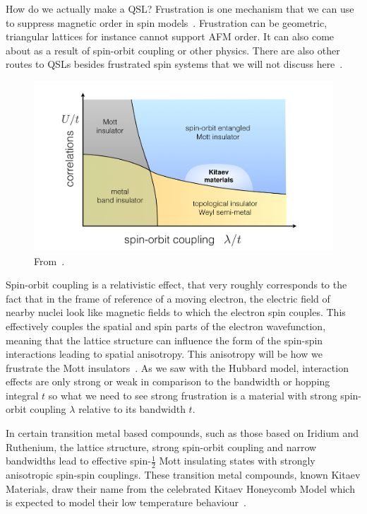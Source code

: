 How do we actually make a QSL? Frustration is one mechanism that we can use to suppress magnetic order in spin models~\autocite{TrebstPhysRep2022}. Frustration can be geometric, triangular lattices for instance cannot support AFM order. It can also come about as a result of spin-orbit coupling or other physics. There are also other routes to QSLs besides frustrated spin systems that we will not discuss here~\autocite{balentsNodalLiquidTheory1998,balentsDualOrderParameter1999,linExactSymmetryWeaklyinteracting1998}.

\hypertarget{fig:correlation_spin_orbit_PT}{%
\begin{figure}
\centering
\includegraphics[width=1\textwidth,height=\textheight]{figure_code/intro_chapter/correlation_spin_orbit_PT.png}
\caption[{Phase Diagram}]{From~\autocite{TrebstPhysRep2022}.}
\label{fig:correlation_spin_orbit_PT}
\end{figure}
}

Spin-orbit coupling is a relativistic effect, that very roughly corresponds to the fact that in the frame of reference of a moving electron, the electric field of nearby nuclei look like magnetic fields to which the electron spin couples. This effectively couples the spatial and spin parts of the electron wavefunction, meaning that the lattice structure can influence the form of the spin-spin interactions leading to spatial anisotropy. This anisotropy will be how we frustrate the Mott insulators~\autocite{jackeliMottInsulatorsStrong2009,khaliullinOrbitalOrderFluctuations2005}. As we saw with the Hubbard model, interaction effects are only strong or weak in comparison to the bandwidth or hopping integral \(t\) so what we need to see strong frustration is a material with strong spin-orbit coupling \(\lambda\) relative to its bandwidth \(t\).

In certain transition metal based compounds, such as those based on Iridium and Ruthenium, the lattice structure, strong spin-orbit coupling and narrow bandwidths lead to effective spin-\(\tfrac{1}{2}\) Mott insulating states with strongly anisotropic spin-spin couplings. These transition metal compounds, known Kitaev Materials, draw their name from the celebrated Kitaev Honeycomb Model which is expected to model their low temperature behaviour~\autocite{Jackeli2009,HerrmannsAnRev2018,Winter2017,TrebstPhysRep2022,Takagi2019}.


